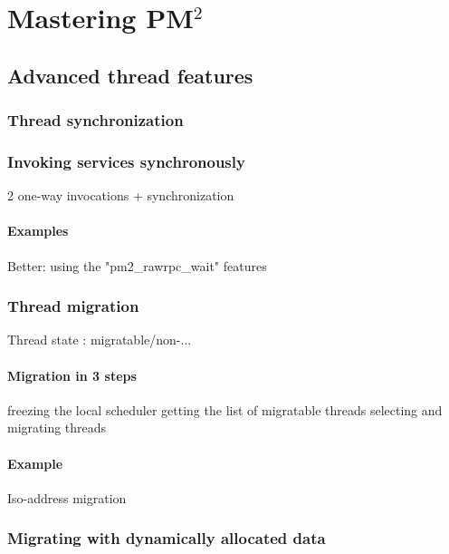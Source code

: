 \documentclass[a4paper,11pt]{report}
\def\pm2{PM$^2$\xspace}
\begin{document}
\chapter{Mastering \pm2}

\section{Advanced thread features}

\subsection{Thread synchronization}

\subsection{Invoking services synchronously}
        2 one-way invocations + synchronization

\subsubsection{Examples}
        Better: using the "pm2\_rawrpc\_wait" features

\subsection{Thread migration}
        Thread state : migratable/non-...

\subsubsection{Migration in 3 steps}
        freezing the local scheduler
        getting the list of migratable threads
        selecting and migrating threads

\subsubsection{Example}
        Iso-address migration

\subsection{Migrating with dynamically allocated data}
\end{document}
